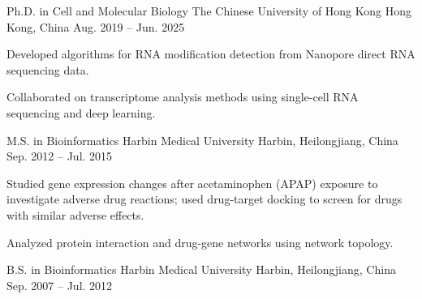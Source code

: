 
\begin{cventries}
  \cventry
    {Ph.D. in Cell and Molecular Biology}
    {The Chinese University of Hong Kong}
    {Hong Kong, China}
    {Aug. 2019 -- Jun. 2025}
    {
      \begin{cvitems}
        \item {Developed algorithms for RNA modification detection from Nanopore direct RNA sequencing data.}
        \item {Collaborated on transcriptome analysis methods using single-cell RNA sequencing and deep learning.}
      \end{cvitems}
    }

  \cventry
    {M.S. in Bioinformatics}
    {Harbin Medical University}
    {Harbin, Heilongjiang, China}
    {Sep. 2012 -- Jul. 2015}
    {
      \begin{cvitems}
        \item {Studied gene expression changes after acetaminophen (APAP) exposure to investigate adverse drug reactions; used drug-target docking to screen for drugs with similar adverse effects.}
        \item {Analyzed protein interaction and drug-gene networks using network topology.}
      \end{cvitems}
    }

  \cventry
    {B.S. in Bioinformatics}
    {Harbin Medical University}
    {Harbin, Heilongjiang, China}
    {Sep. 2007 -- Jul. 2012}
    {}
\end{cventries}
